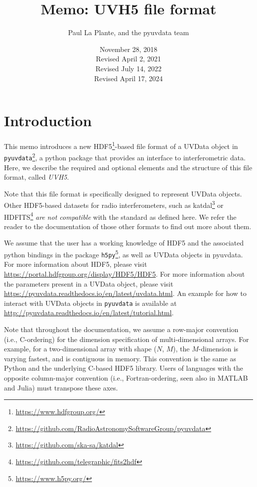 \documentclass[11pt, oneside]{article}
\title{Memo: UVH5 file format}
\author{Paul La Plante, and the pyuvdata team}
\date{November 28, 2018\\
Revised April 2, 2021\\
Revised July 14, 2022\\
Revised April 17, 2024
}
\begin{document}
\maketitle
\tableofcontents
\section{Introduction}
\label{sec:intro}
This memo introduces a new HDF5\footnote{\url{https://www.hdfgroup.org/}}-based
file format of a UVData object in
\verb+pyuvdata+\footnote{\url{https://github.com/RadioAstronomySoftwareGroup/pyuvdata}}, a python
package that provides an interface to interferometric data. Here, we describe
the required and optional elements and the structure of this file format, called
\textit{UVH5}.

Note that this file format is specifically designed to represent UVData
objects. Other HDF5-based datasets for radio interferometers, such as
katdal\footnote{\url{https://github.com/ska-sa/katdal}} or
HDFITS\footnote{\url{https://github.com/telegraphic/fits2hdf}} \textit{are not
  compatible} with the standard as defined here. We refer the reader to the
documentation of those other formats to find out more about them.

We assume that the user has a working knowledge of HDF5 and the associated
python bindings in the package \verb+h5py+\footnote{\url{https://www.h5py.org/}}, as
well as UVData objects in pyuvdata. For more information about HDF5, please
visit \url{https://portal.hdfgroup.org/display/HDF5/HDF5}. For more information
about the parameters present in a UVData object, please visit
\url{https://pyuvdata.readthedocs.io/en/latest/uvdata.html}. An
example for how to interact with UVData objects in \texttt{pyuvdata} is available at
\url{http://pyuvdata.readthedocs.io/en/latest/tutorial.html}.

Note that throughout the documentation, we assume a row-major convention (i.e.,
C-ordering) for the dimension specification of multi-dimensional arrays. For
example, for a two-dimensional array with shape ($N$, $M$), the $M$-dimension is
varying fastest, and is contiguous in memory. This convention is the same as
Python and the underlying C-based HDF5 library. Users of languages with the
opposite column-major convention (i.e., Fortran-ordering, seen also in MATLAB
and Julia) must transpose these axes.
\end{document}
